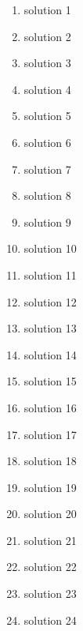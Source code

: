  \begin{solutions}{}{
\begin{enumerate}[itemsep=5pt, label=\textbf{\arabic*}. ] 


\item solution 1
\item solution 2
\item solution 3
\item solution 4
\item solution 5
\item solution 6
\item solution 7
\item solution 8
\item solution 9
\item solution 10
\item solution 11
\item solution 12
\item solution 13
\item solution 14
\item solution 15
\item solution 16
\item solution 17
\item solution 18
\item solution 19
\item solution 20
\item solution 21
\item solution 22
\item solution 23
\item solution 24

\end{enumerate}}
\end{solutions}


